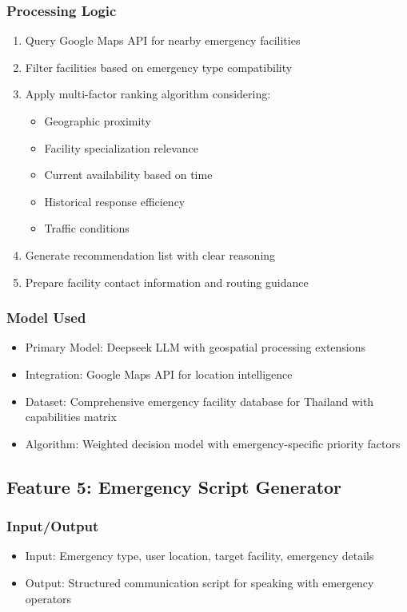 \subsubsection{Processing Logic}
\begin{enumerate}
    \item Query Google Maps API for nearby emergency facilities
    \item Filter facilities based on emergency type compatibility
    \item Apply multi-factor ranking algorithm considering:
    \begin{itemize}
        \item Geographic proximity
        \item Facility specialization relevance
        \item Current availability based on time
        \item Historical response efficiency
        \item Traffic conditions
    \end{itemize}
    \item Generate recommendation list with clear reasoning
    \item Prepare facility contact information and routing guidance
\end{enumerate}

\subsubsection{Model Used}
\begin{itemize}
    \item Primary Model: Deepseek LLM with geospatial processing extensions
    \item Integration: Google Maps API for location intelligence
    \item Dataset: Comprehensive emergency facility database for Thailand with capabilities matrix
    \item Algorithm: Weighted decision model with emergency-specific priority factors
\end{itemize}

\subsection{Feature 5: Emergency Script Generator}

\subsubsection{Input/Output}
\begin{itemize}
    \item Input: Emergency type, user location, target facility, emergency details
    \item Output: Structured communication script for speaking with emergency operators
\end{itemize}

